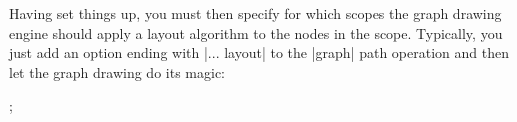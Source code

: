 \begin{codeexample}
\usetikzlibrary{graphs, graphdrawing}
\end{codeexample}

Having set things up, you must then specify for which scopes the
graph drawing engine should apply a layout algorithm to the nodes in
the scope. Typically, you just add an option ending with |... layout|
to the |graph| path operation and then let the graph drawing do its
magic:

\begin{codeexample}[]
  ;    
\end{codeexample}

